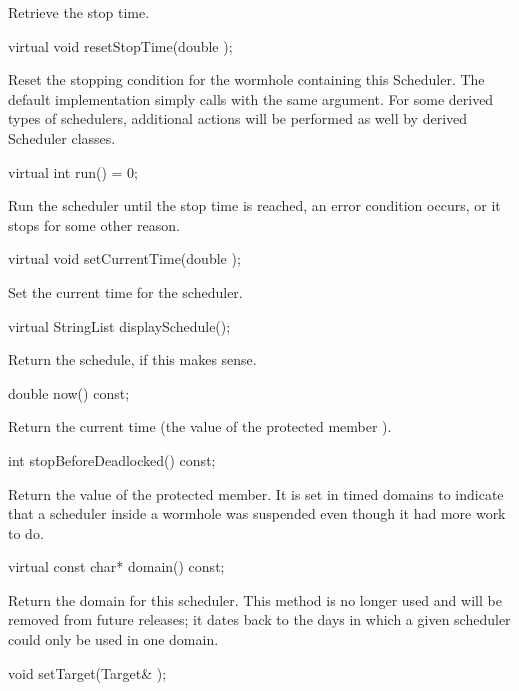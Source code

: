 Retrieve the stop time.

\begin{example}
virtual void resetStopTime(double );
\end{example}

Reset the stopping condition for the wormhole containing this Scheduler.
The default implementation simply calls  with
the same argument.  For some derived types of schedulers, additional
actions will be performed as well by derived Scheduler classes.

\begin{example}
virtual int run() = 0;
\end{example}

Run the scheduler until the stop time is reached, an error condition
occurs, or it stops for some other reason.

\begin{example}
virtual void setCurrentTime(double );
\end{example}

Set the current time for the scheduler.

\begin{example}
virtual StringList displaySchedule();
\end{example}

Return the schedule, if this makes sense.

\begin{example}
double now() const;
\end{example}

Return the current time (the value of the protected member
).

\begin{example}
int stopBeforeDeadlocked() const;
\end{example}

Return the value of the  protected member.
It is set in timed domains to indicate that a scheduler inside a
wormhole was suspended even though it had more work to do.

\begin{example}
virtual const char* domain() const;
\end{example}

Return the domain for this scheduler.  This method is no longer used and
will be removed from future releases; it dates back to the days
in which a given scheduler could only be used in one domain.

\begin{example}
void setTarget(Target& );
\end{example}

